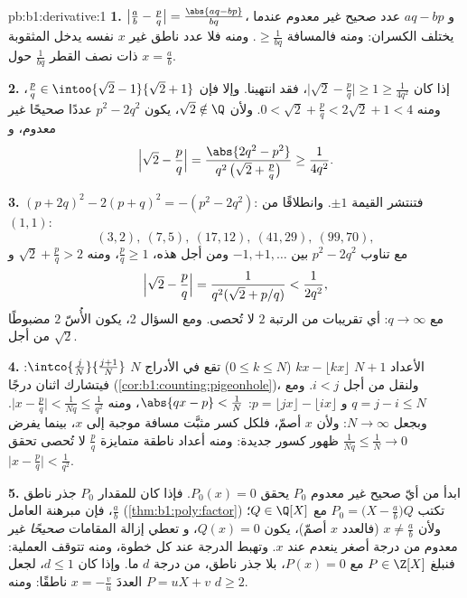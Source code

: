 \begin{solution}{pb:b1:derivative:1}
\textbf{1.} $\bigl|\frac ab - \frac pq\bigr| = \frac{\abs{aq -
bp}}{bq}$، و $aq - bp$ عدد صحيح غير معدوم عندما يختلف
الكسران: ومنه فالمسافة $\geq \frac{1}{bq}$. ومنه فلا عدد ناطق
غير $x$ نفسه يدخل  المثقوبة ذات نصف القطر
$\frac{1}{bq}$ حول $x = \frac ab$.

\textbf{2.} إذا كان $\bigl|\sqrt2 - \frac pq\bigr| \geq 1 \geq
\frac{1}{4q^2}$، فقد انتهينا. وإلا فإن $\frac pq \in \intoo{\sqrt2 -
1}{\sqrt2 + 1}$، ومنه $0 < \sqrt2 + \frac pq < 2\sqrt2 + 1 < 4$.
ولأن $\sqrt 2 \notin \Q$، يكون $p^2 - 2q^2$ عددًا صحيحًا غير معدوم، و
\[
\Bigl|\sqrt2 - \frac pq\Bigr|
= \frac{\abs{2q^2 - p^2}}{q^2\,\bigl(\sqrt2 + \frac pq\bigr)}
\geq \frac{1}{4q^2} .
\]

\textbf{3.} $(p + 2q)^2 - 2(p + q)^2 = -(p^2 - 2q^2)$: فتنتشر القيمة
$\pm1$. وانطلاقًا من $(1,1)$:
\[
(3,2),\ (7,5),\ (17,12),\ (41,29),\ (99,70),
\]
مع تناوب $p^2 - 2q^2$ بين $-1, +1, \dots$
ومن أجل هذه، $\frac pq \geq 1$، ومنه $\sqrt2 + \frac pq > 2$ و
\[
\Bigl|\sqrt2 - \frac pq\Bigr| =
\frac{1}{q^2(\sqrt2 + p/q)} < \frac{1}{2q^2} ,
\]
مع $q \to \infty$: أي تقريبات من الرتبة $2$ لا تُحصى.
ومع السؤال 2، يكون الأُسّ $2$ مضبوطًا من أجل $\sqrt 2$.

\textbf{4.} الأعداد $N + 1$ $kx - \lfloor kx\rfloor$ ($0
\leq k \leq N$) تقع في الأدراج $N$ $\intco{\frac
jN}{\frac{j+1}{N}}$: فيتشارك اثنان درجًا
(\cref{cor:b1:counting:pigeonhole})، ولنقل من أجل $i < j$. ومع $q =
j - i \leq N$ و $p = \lfloor jx\rfloor - \lfloor ix\rfloor$:
$\abs{qx - p} < \frac1N$، ومنه $\bigl|x - \frac pq\bigr| <
\frac{1}{Nq} \leq \frac{1}{q^2}$. وبجعل $N \to \infty$: ولأن
$x$ أصمّ، فلكل كسر مثبَّت مسافة موجبة إلى
$x$، بينما يفرض $\frac{1}{Nq} \leq \frac 1N \to 0$ ظهور كسور
جديدة: ومنه أعداد ناطقة متمايزة $\frac pq$ لا تُحصى تحقق
$\bigl|x - \frac pq\bigr| < \frac{1}{q^2}$.

\textbf{5.} ابدأ من أيّ  صحيح غير معدوم $P_0$ يحقق $P_0(x) =
0$. فإذا كان للمقدار $P_0$ جذر ناطق $\frac ab$، فإن مبرهنة العامل
(\cref{thm:b1:poly:factor}) تكتب $P_0 = \bigl(X - \frac
ab\bigr)Q$ مع $Q \in \Q[X]$؛
ولأن $x \neq \frac ab$ (فالعدد $x$ أصمّ)، يكون $Q(x) = 0$، و
تعطي إزالة المقامات  \emph{صحيحًا} غير معدوم
من درجة أصغر ينعدم عند $x$. وتهبط الدرجة عند كل
خطوة، ومنه تتوقف العملية: فنبلغ $P \in \Z[X]$ مع $P(x) = 0$،
بلا جذر ناطق، من درجة $d$ ما. وإذا كان $d \leq 1$، لجعل $P =
uX + v$ العددَ $x = -\frac vu$ ناطقًا: ومنه $d \geq 2$.


\end{solution}
